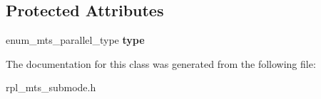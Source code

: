 \subsection*{Protected Attributes}
\begin{DoxyCompactItemize}
\item 
\mbox{\label{classMts__submode_a463807bdef1fea15c6bd7653b1e420ce}} 
enum\+\_\+mts\+\_\+parallel\+\_\+type {\bfseries type}
\end{DoxyCompactItemize}


The documentation for this class was generated from the following file\+:\begin{DoxyCompactItemize}
\item 
rpl\+\_\+mts\+\_\+submode.\+h\end{DoxyCompactItemize}
